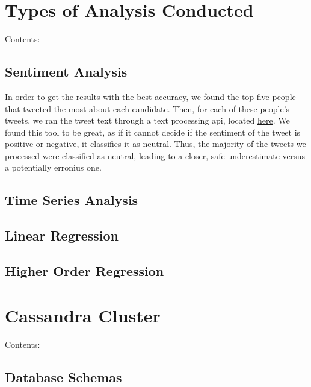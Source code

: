 \documentclass[letterpaper,12pt,english]{sphinxmanual}
\begin{document}
\section{Types of Analysis Conducted}
\label{analysis:types-of-analysis-conducted}\label{analysis::doc}
Contents:


\subsection{Sentiment Analysis}
\label{sentimentAnalysis:sentiment-analysis}\label{sentimentAnalysis::doc}
In order to get the results with the best accuracy, we found the top five people that tweeted the most about each candidate. Then, for each of these people's tweets, we ran the tweet text through a text processing api, located \href{http://www.text-processing.com}{here}. We found this tool to be great, as if it cannot decide if the sentiment of the tweet is positive or negative, it classifies it as neutral. Thus, the majority of the tweets we processed were classified as neutral, leading to a closer, safe underestimate versus a potentially erronius one.


\subsection{Time Series Analysis}
\label{timeSeriesAnalysis::doc}\label{timeSeriesAnalysis:time-series-analysis}\label{timeSeriesAnalysis:here}

\subsection{Linear Regression}
\label{linearRegression:linear-regression}\label{linearRegression::doc}

\subsection{Higher Order Regression}
\label{higherOrderRegression::doc}\label{higherOrderRegression:higher-order-regression}

\section{Cassandra Cluster}
\label{cassandraDB::doc}\label{cassandraDB:cassandra-cluster}
Contents:


\subsection{Database Schemas}
\label{schema:database-schemas}\label{schema::doc}
\end{document}

